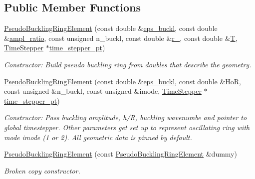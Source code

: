 \subsection*{Public Member Functions}
\begin{DoxyCompactItemize}
\item 
\hyperlink{classoomph_1_1PseudoBucklingRingElement_aec9c719fb7663e158b2cdefa088bb254}{Pseudo\+Buckling\+Ring\+Element} (const double \&\hyperlink{classoomph_1_1PseudoBucklingRing_ad28891383abe71a473a079721c6dd53e}{eps\+\_\+buckl}, const double \&\hyperlink{classoomph_1_1PseudoBucklingRing_ade2881e77f7cf0be26970c78c70d3a4d}{ampl\+\_\+ratio}, const unsigned n\+\_\+buckl, const double \&\hyperlink{classoomph_1_1PseudoBucklingRing_ad202df097c0a68d93a5b2f99abf4c39b}{r\+\_}, const double \&\hyperlink{classoomph_1_1PseudoBucklingRing_af53f509aa119f74c77ae45046023f28f}{T}, \hyperlink{classoomph_1_1TimeStepper}{Time\+Stepper} $\ast$\hyperlink{classoomph_1_1GeomObject_a3c92023891dd4a0e818022f467eeb7f1}{time\+\_\+stepper\+\_\+pt})
\begin{DoxyCompactList}\small\item\em Constructor\+: Build pseudo buckling ring from doubles that describe the geometry. \end{DoxyCompactList}\item 
\hyperlink{classoomph_1_1PseudoBucklingRingElement_abe188902d3d2ab9dede7f958b5c3eb68}{Pseudo\+Buckling\+Ring\+Element} (const double \&\hyperlink{classoomph_1_1PseudoBucklingRing_ad28891383abe71a473a079721c6dd53e}{eps\+\_\+buckl}, const double \&HoR, const unsigned \&n\+\_\+buckl, const unsigned \&imode, \hyperlink{classoomph_1_1TimeStepper}{Time\+Stepper} $\ast$\hyperlink{classoomph_1_1GeomObject_a3c92023891dd4a0e818022f467eeb7f1}{time\+\_\+stepper\+\_\+pt})
\begin{DoxyCompactList}\small\item\em Constructor\+: Pass buckling amplitude, h/R, buckling wavenumbe and pointer to global timestepper. Other parameters get set up to represent oscillating ring with mode imode (1 or 2). All geometric data is pinned by default. \end{DoxyCompactList}\item 
\hyperlink{classoomph_1_1PseudoBucklingRingElement_a7918aaec2b165086d527517c52525849}{Pseudo\+Buckling\+Ring\+Element} (const \hyperlink{classoomph_1_1PseudoBucklingRingElement}{Pseudo\+Buckling\+Ring\+Element} \&dummy)
\begin{DoxyCompactList}\small\item\em Broken copy constructor. \end{DoxyCompactList}\item 

\end{DoxyCompactItemize}
